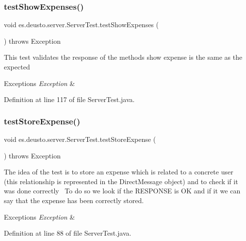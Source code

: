 \subsubsection{\texorpdfstring{test\+Show\+Expenses()}{testShowExpenses()}}
{\footnotesize\ttfamily void es.\+deusto.\+server.\+Server\+Test.\+test\+Show\+Expenses (\begin{DoxyParamCaption}{ }\end{DoxyParamCaption}) throws Exception}

This test validates the response of the methods show expense is the same as the expected 
\begin{DoxyExceptions}{Exceptions}
{\em Exception} & \\
\hline
\end{DoxyExceptions}


Definition at line 117 of file Server\+Test.\+java.

\mbox{\label{classes_1_1deusto_1_1server_1_1_server_test_a7406203a7ff08400597008ca722f6205}} 
\subsubsection{\texorpdfstring{test\+Store\+Expense()}{testStoreExpense()}}
{\footnotesize\ttfamily void es.\+deusto.\+server.\+Server\+Test.\+test\+Store\+Expense (\begin{DoxyParamCaption}{ }\end{DoxyParamCaption}) throws Exception}

The idea of the test is to store an expense which is related to a concrete user (this relationship is represented in the Direct\+Message object) and to check if it was done correctly~\newline
To do so we look if the R\+E\+S\+P\+O\+N\+SE is OK and if it we can say that the expense has been correctly stored. 
\begin{DoxyExceptions}{Exceptions}
{\em Exception} & \\
\hline
\end{DoxyExceptions}


Definition at line 88 of file Server\+Test.\+java.

